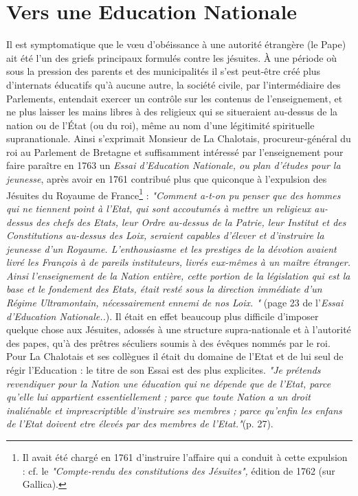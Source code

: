 \section{Vers une Education Nationale}
 Il est symptomatique que le vœu d'obéissance à une autorité étrangère (le Pape) ait été l'un des griefs principaux formulés contre les jésuites. À une période où sous la pression des parents et des municipalités il s'est peut-être créé plus d'internats éducatifs qu'à aucune autre, la société civile, par l'intermédiaire des Parlements, entendait exercer un contrôle sur les contenus de l'enseignement, et ne plus laisser les mains libres à des religieux qui se situeraient au-dessus de la nation ou de l'État (ou du roi), même au nom d'une légitimité spirituelle supranationale. Ainsi s'exprimait Monsieur de La Chalotais, procureur-général du roi au Parlement de Bretagne et suffisamment intéressé par l'enseignement pour faire paraître en 1763 un \emph{Essai d'Education Nationale, ou plan d'études pour la jeunesse}, après avoir en 1761 contribué plus que quiconque à l'expulsion des Jésuites du Royaume de France\footnote{Il avait été chargé en 1761 d'instruire l'affaire qui a conduit à cette expulsion : cf. le \emph{"Compte-rendu des constitutions des Jésuites",} édition de 1762 (sur Gallica).}
 : \emph{"Comment a-t-on pu penser que des hommes qui ne tiennent point à l'Etat, qui sont accoutumés à mettre un religieux au-dessus des chefs des Etats, leur Ordre au-dessus de la Patrie, leur Institut et des Constitutions au-dessus des Loix, seraient capables d'élever et d'instruire la jeunesse d'un Royaume. L'enthousiasme et les prestiges de la dévotion avaient livré les François à de pareils instituteurs, livrés eux-mêmes à un maître étranger. Ainsi l'enseignement de la Nation entière, cette portion de la législation qui est la base et le fondement des Etats, était resté sous la direction immédiate d'un Régime Ultramontain, nécessairement ennemi de nos Loix. "} (page 23 de l'\emph{Essai d'Education Nationale..}). Il était en effet beaucoup plus difficile d'imposer quelque chose aux Jésuites, adossés à une structure supra-nationale et à l'autorité des papes, qu'à des prêtres séculiers soumis à des évêques nommés par le roi. Pour La Chalotais et ses collègues il était du domaine de l'Etat et de lui seul de régir l'Education : le titre de son Essai est des plus explicites.  \emph{"Je prétends revendiquer pour la Nation une éducation qui ne dépende que de l'Etat, parce qu'elle lui appartient essentiellement ; parce que toute Nation a un droit inaliénable et imprescriptible d'instruire ses membres ; parce qu'enfin les enfans de l'Etat doivent etre élevés par des membres de l'Etat."}(p. 27). 
 
